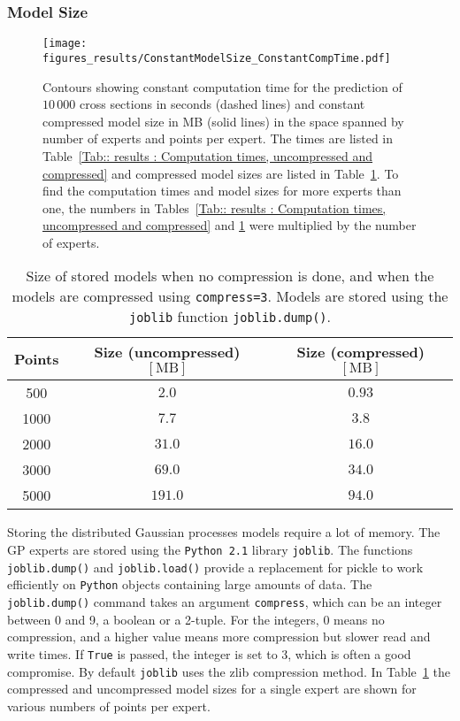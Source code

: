 \documentclass[twoside,english]{uiofysmaster}
\begin{document}
{{\subsubsection{Model Size}

\begin{figure}
\centering
\texttt{[image: figures\_results/ConstantModelSize\_ConstantCompTime.pdf]}
\caption[Computation times and model sizes]{Contours showing constant computation time for the prediction of $10\,000$ cross sections in seconds (dashed lines) and constant compressed model size in MB (solid lines) in the space spanned by number of experts and points per expert. The times are listed in Table~\ref{Tab:: results : Computation times, uncompressed and compressed} and compressed model sizes are listed in Table~\ref{Tab:: results : Model sizes, uncompressed and compressed}. To find the computation times and model sizes for more experts than one, the numbers in Tables~\ref{Tab:: results : Computation times, uncompressed and compressed} and \ref{Tab:: results : Model sizes, uncompressed and compressed} were multiplied by the number of experts.}
\label{Fig:: results : Contours of constant time and storage size}
\end{figure}

\begin{table}
\centering
\begin{tabular}{@{}ccc@{}} \toprule
Points & Size (uncompressed) $[\mathrm{MB}]$ & Size (compressed) $[\mathrm{MB}]$\\ \midrule
500 & $2.0$ & $0.93$\\
1000 & $7.7$ & $3.8$\\
2000 & $31.0$ & $16.0$\\
3000 & $69.0$ & $34.0$ \\
5000 & $191.0$ & $94.0$\\ \bottomrule
\end{tabular}
\caption{Size of stored models when no compression is done, and when the models are compressed using {\tt compress=3}. Models are stored using the {\tt joblib} function {\tt joblib.dump()}. }
\label{Tab:: results : Model sizes, uncompressed and compressed}
\end{table}

Storing the distributed Gaussian processes models require a lot of memory. The GP experts are stored using the \verb|Python 2.1| library \verb|joblib|. The functions \verb|joblib.dump()| and \verb|joblib.load()| provide a replacement for pickle to work efficiently on \verb|Python| objects containing large amounts of data. The \verb|joblib.dump()| command takes an argument \verb|compress|, which can be an integer between 0 and 9, a boolean or a 2-tuple. For the integers, 0 means no compression, and a higher value means more compression but slower read and write times. If \verb|True| is passed, the integer is set to 3, which is often a good compromise. By default \verb|joblib| uses the zlib compression method. In Table~\ref{Tab:: results : Model sizes, uncompressed and compressed} the compressed and uncompressed model sizes for a single expert are shown for various numbers of points per expert.

}}
\end{document}
